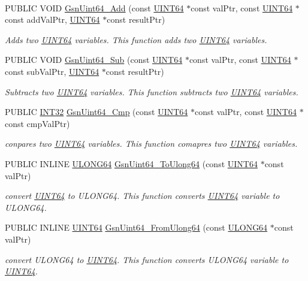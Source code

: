 \paragraph*{}
\begin{DoxyCompactItemize}
\item 
PUBLIC VOID \hyperlink{a00633_gac563e9d0ef4149a2e6bf4b69848b8350}{GsnUint64\_\-Add} (const \hyperlink{a00462}{UINT64} $\ast$const valPtr, const \hyperlink{a00462}{UINT64} $\ast$const addValPtr, \hyperlink{a00462}{UINT64} $\ast$const resultPtr)
\begin{DoxyCompactList}\small\item\em Adds two \hyperlink{a00462}{UINT64} variables. This function adds two \hyperlink{a00462}{UINT64} variables. \end{DoxyCompactList}\item 
PUBLIC VOID \hyperlink{a00633_gaa28251a236e953a0f7d7c9cc6d2a4f56}{GsnUint64\_\-Sub} (const \hyperlink{a00462}{UINT64} $\ast$const valPtr, const \hyperlink{a00462}{UINT64} $\ast$const subValPtr, \hyperlink{a00462}{UINT64} $\ast$const resultPtr)
\begin{DoxyCompactList}\small\item\em Subtracts two \hyperlink{a00462}{UINT64} variables. This function subtracts two \hyperlink{a00462}{UINT64} variables. \end{DoxyCompactList}\item 
PUBLIC \hyperlink{a00660_ga63021d67d54286c2163bcdb43a6f2569}{INT32} \hyperlink{a00633_ga6f146e62b0ba7c60b788e7567b9a43d7}{GsnUint64\_\-Cmp} (const \hyperlink{a00462}{UINT64} $\ast$const valPtr, const \hyperlink{a00462}{UINT64} $\ast$const cmpValPtr)
\begin{DoxyCompactList}\small\item\em conpares two \hyperlink{a00462}{UINT64} variables. This function comapres two \hyperlink{a00462}{UINT64} variables. \end{DoxyCompactList}\item 
PUBLIC INLINE \hyperlink{a00660_ga28961430434ccabca6862ea93fe9a15b}{ULONG64} \hyperlink{a00633_ga91c8c7e7593d471df3663ac581c75140}{GsnUint64\_\-ToUlong64} (const \hyperlink{a00462}{UINT64} $\ast$const valPtr)
\begin{DoxyCompactList}\small\item\em convert \hyperlink{a00462}{UINT64} to ULONG64. This function converts \hyperlink{a00462}{UINT64} variable to ULONG64. \end{DoxyCompactList}\item 
PUBLIC INLINE \hyperlink{a00462}{UINT64} \hyperlink{a00633_gaae22c3035a2dff23ae786020704f0e24}{GsnUint64\_\-FromUlong64} (const \hyperlink{a00660_ga28961430434ccabca6862ea93fe9a15b}{ULONG64} $\ast$const valPtr)
\begin{DoxyCompactList}\small\item\em convert ULONG64 to \hyperlink{a00462}{UINT64}. This function converts ULONG64 variable to \hyperlink{a00462}{UINT64}. \end{DoxyCompactList}\end{DoxyCompactItemize}



